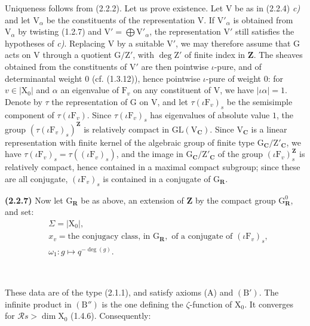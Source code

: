 \documentclass[11pt,leqno]{article}
\newcommand{\Page}[1]{\ifvmode\noindent\else\unskip\ \fi{\footnotesize\textcolor{gray}{[p.\,#1]}}\ \ignorespaces}
\begin{document}
Uniqueness follows from (2.2.2). Let us prove existence. Let \(\mathrm V\) be as in (2.2.4) \textit{c)} and let \(\mathrm V_\alpha\) be the constituents of the representation \(\mathrm V\). If \(\mathrm V'_\alpha\) is obtained from \(\mathrm V_\alpha\) by twisting (1.2.7) and \(\mathrm V'=\bigoplus\mathrm V'_\alpha\), the representation \(\mathrm V'\) still satisfies the hypotheses of \textit{c)}. Replacing \(\mathrm V\) by a suitable \(\mathrm V'\), we may therefore assume that \(\mathrm G\) acts on \(\mathrm V\) through a quotient \(\mathrm G/\mathrm Z'\), with \(\deg\mathrm Z'\) of finite index in \(\mathbf Z\). The sheaves obtained from the constituents of \(\mathrm V'\) are then pointwise \(\iota\)-pure, and of determinantal weight \(0\) (cf. (1.3.12)), hence pointwise \(\iota\)-pure of weight \(0\): for \(v\in|\mathrm X_0|\) and \(\alpha\) an eigenvalue of \(\mathrm F_v\) on any constituent of \(\mathrm V\), we have \(|\iota\alpha|=1\). Denote by \(\tau\) the representation of \(\mathrm G\) on \(\mathrm V\), and let \(\tau(\iota\mathrm F_v)_s\) be the semisimple component of \(\tau(\iota\mathrm F_v)\). Since \(\tau(\iota\mathrm F_v)_s\) has eigenvalues of absolute value \(1\), the group \((\tau(\iota\mathrm F_v)_s)^{\mathbf Z}\) is relatively compact in \(\mathrm{GL}(\mathrm V_{\mathbf C})\). Since \(\mathrm V_{\mathbf C}\) is a linear representation with finite kernel of the algebraic group of finite type \(\mathrm G_{\mathbf C}/\mathrm Z'_{\mathbf C}\), we have \(\tau(\iota\mathrm F_v)_s=\tau((\iota\mathrm F_v)_s)\), and the image in \(\mathrm G_{\mathbf C}/\mathrm Z'_{\mathbf C}\) of the group \((\iota\mathrm F_v)_s^{\mathbf Z}\) is relatively compact, hence contained in a maximal compact subgroup; since these are all conjugate, \((\iota\mathrm F_v)_s\) is contained in a conjugate of \(\mathrm G_{\mathbf R}\).

\textbf{(2.2.7)} Now let \(\mathrm G_{\mathbf R}\) be as above, an extension of \(\mathbf Z\) by the compact group \(\mathrm G_{\mathbf R}^0\), and set:
\[
\begin{aligned}
&\Sigma=|\mathrm X_0|,\\
&x_v=\text{the conjugacy class, in }\mathrm G_{\mathbf R},
  \text{ of a conjugate of }(\iota\mathrm F_v)_s,\\
&\omega_1:g\mapsto q^{-\deg(g)}.
\end{aligned}
\]

\Page{195}

These data are of the type (2.1.1), and satisfy axioms (A) and \((\mathrm B')\). The infinite product in \((\mathrm B'')\) is the one defining the \(\zeta\)-function of \(\mathrm X_0\). It converges for \(\mathscr R s>\dim\mathrm X_0\) (1.4.6). Consequently:
\end{document}
